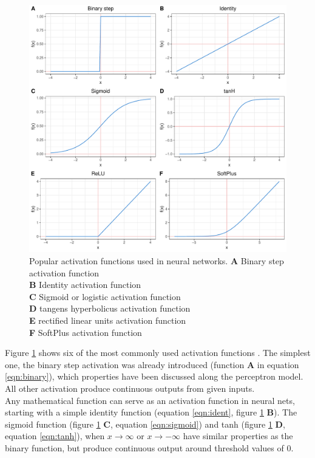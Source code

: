 \begin{figure}[H]
\centering
\includegraphics[height=.55\textheight, width=.85\textwidth]{Figures/activation}
\decoRule
\caption[Popular activation functions for neural networks]{Popular activation functions used in
  neural networks.
  \textbf{A} Binary step activation function \\
  \textbf{B} Identity activation function \\
  \textbf{C} Sigmoid or logistic activation function \\
  \textbf{D} tangens hyperbolicus activation function \\
  \textbf{E} rectified linear units activation function \\
  \textbf{F} SoftPlus activation function\\}
\label{fig:activation}
\end{figure}


Figure \ref{fig:activation} shows six of the most commonly used activation functions
\cite{warner1996understanding}. The simplest one, the binary step activation was already introduced
(function \textbf{A} in equation \ref{eqn:binary}), which properties have been discussed along the
perceptron model. All other activation produce continuous outputs from given inputs. \\
Any mathematical function can serve as an activation function in neural nets, starting with a simple
identity function (equation \ref{eqn:ident}, figure \ref{fig:activation} \textbf{B}). The sigmoid
function (figure \ref{fig:activation} \textbf{C}, equation \ref{eqn:sigmoid}) and tanh (figure
\ref{fig:activation} \textbf{D}, equation \ref{eqn:tanh}), when $x \rightarrow \infty$ or
$x \rightarrow -\infty$ have similar properties as the binary function, but produce continuous
output around threshold values of 0.

